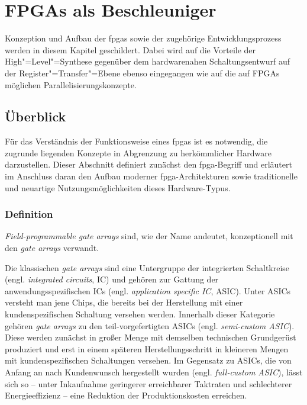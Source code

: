 \chapter{FPGAs als Beschleuniger}\label{fpga}

Konzeption und Aufbau der \gls{fpga}s sowie der zugehörige Entwicklungsprozess
werden in diesem Kapitel geschildert. Dabei wird auf die Vorteile der
High"=Level"=Synthese gegenüber dem hardwarenahen Schaltungsentwurf auf der
Register"=Transfer"=Ebene ebenso eingegangen wie auf die auf FPGAs möglichen
Parallelisierungskonzepte.

\section{Überblick}\label{fpga:ueberblick}

Für das Verständnis der Funktionsweise eines \gls{fpga}s ist es notwendig, die
zugrunde liegenden Konzepte in Abgrenzung zu herkömmlicher Hardware
darzustellen. Dieser Abschnitt definiert zunächst den \gls{fpga}-Begriff und
erläutert im Anschluss daran den Aufbau moderner \gls{fpga}-Architekturen sowie
traditionelle und neuartige Nutzungsmöglichkeiten dieses Hardware-Typus.

\subsection{Definition}\label{fpga:ueberblick:definition}

\textit{Field-programmable gate arrays} sind, wie der Name andeutet,
konzeptionell mit den \textit{gate arrays} verwandt.

Die klassischen \textit{gate arrays} sind eine Untergruppe der integrierten
Schaltkreise (engl. \textit{integrated circuits}, IC) und gehören zur Gattung
der anwendungsspezifischen ICs (engl. \textit{application specific IC}, ASIC).
Unter ASICs versteht man jene Chips, die bereits bei der Herstellung mit einer
kundenspezifischen Schaltung versehen werden. Innerhalb dieser Kategorie gehören
\textit{gate arrays} zu den teil-vorgefertigten ASICs (engl.
\textit{semi-custom ASIC}). Diese werden zunächst in großer Menge mit demselben
technischen Grundgerüst produziert und erst in einem späteren
Herstellungsschritt in kleineren Mengen mit kundenspezifischen Schaltungen
versehen. Im Gegensatz zu ASICs, die von Anfang an nach Kundenwunsch hergestellt
wurden (engl. \textit{full-custom ASIC}), lässt sich so -- unter Inkaufnahme
geringerer erreichbarer Taktraten und schlechterer Energieeffizienz -- eine
Reduktion der Produktionskosten erreichen. \cite[vgl.][123]{kesel2013}

